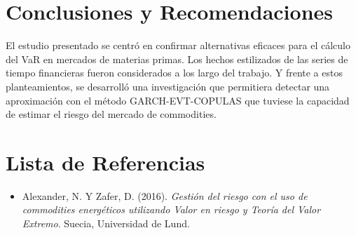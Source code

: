 \documentclass[a4paper,12pt]{Latex/Classes/PhDthesisPSnPDF}
\begin{document}

\chapter*{Conclusiones y Recomendaciones}

El estudio presentado se centró en confirmar alternativas eficaces para el cálculo del VaR en mercados de materias primas. Los hechos estilizados de las series de tiempo financieras fueron considerados a los largo del trabajo. Y frente a estos planteamientos, se desarrolló una investigación que permitiera detectar una aproximación con el método GARCH-EVT-COPULAS que tuviese la capacidad de estimar el riesgo del mercado de commodities.\\


\chapter*{Lista de Referencias}

\begin{itemize}

\item Alexander, N. Y Zafer, D. (2016). \textit{Gestión del riesgo con el uso de commodities energéticos utilizando Valor en riesgo y Teoría del Valor Extremo}. Suecia, Universidad de Lund.

\end{itemize}
\end{document}
